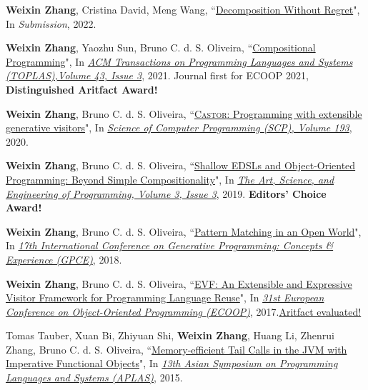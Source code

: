 \documentclass[paper=letter,fontsize=11pt]{scrartcl} %
\newcommand{\PaperEntry}[4]{
		\noindent #1, ``{#2}", In \textit{#3}, #4.} %
\begin{document}
\begin{etaremune}

\item \PaperEntry{\textbf{Weixin Zhang}, Cristina David, Meng Wang}{\href{https://arxiv.org/abs/2204.10411}{Decomposition Without Regret}}{Submission}{2022}

\item \PaperEntry{\textbf{Weixin Zhang}, Yaozhu Sun, Bruno C. d. S.
    Oliveira}{\href{https://wxzh.github.io/papers/toplas2021.pdf}{Compositional Programming}}{\href{https://dx.doi.org/10.1145/3460228}{ACM Transactions on Programming Languages and Systems (TOPLAS),Volume 43, Issue 3}}{2021}{ Journal first for ECOOP 2021, \textbf{Distinguished Aritfact Award!}}

\item \PaperEntry{\textbf{Weixin Zhang}, Bruno C. d. S.
    Oliveira}{\href{https://wxzh.github.io/papers/scp2020.pdf}{\textsc{Castor}: Programming with extensible generative
    visitors}}{\href{https://doi.org/10.1016/j.scico.2020.102449}{Science of Computer Programming (SCP), Volume 193}}{2020} 

\item \PaperEntry{\textbf{Weixin Zhang}, Bruno C. d. S. Oliveira}{\href{https://wxzh.github.io/papers/programming19.pdf}{Shallow EDSLs
    and Object-Oriented Programming: Beyond Simple Compositionality}}{\href{https://programming-journal.org/2019/3/10/}{The Art,
    Science, and Engineering of Programming, Volume 3, Issue 3}}{2019}{ \textbf{Editors' Choice Award!}}

\item \PaperEntry{\textbf{Weixin Zhang}, Bruno C. d. S. Oliveira}{\href{https://wxzh.github.io/papers/gpce2018.pdf}{Pattern
    Matching in an Open World}}{\href{https://dl.acm.org/doi/10.1145/3278122.3278124}{17th International Conference on Generative Programming: Concepts \& Experience (GPCE)}}{2018}

\item \PaperEntry{\textbf{Weixin Zhang}, Bruno C. d. S. Oliveira}{\href{https://wxzh.github.io/papers/ecoop2017.pdf}{EVF: An Extensible and
    Expressive Visitor Framework for Programming Language Reuse}}{\href{https://2017.ecoop.org/track/ecoop-2017-papers}{31st European Conference on Object-Oriented Programming (ECOOP)}}{2017}{\href{https://2017.ecoop.org/track/ecoop-2017-Artifacts#accepted-artifacts}{Aritfact evaluated!}}

\item \PaperEntry{Tomas Tauber, Xuan Bi, Zhiyuan Shi, \textbf{Weixin Zhang}, Huang Li, Zhenrui Zhang, Bruno C. d. S. Oliveira}{\href{https://wxzh.github.io/papers/aplas2015.pdf}{Memory-efficient Tail Calls in the JVM with Imperative Functional Objects}}
{\href{https://link.springer.com/chapter/10.1007\%2F978-3-319-26529-2_2}{13th Asian Symposium on Programming Languages and Systems (APLAS)}}{2015}
\end{etaremune}
\end{document}
